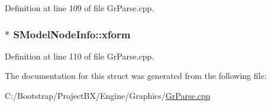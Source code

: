 Definition at line 109 of file GrParse.cpp.\hypertarget{struct_s_model_node_info_3d23e4e63314a9d0115a4fd1c84a14a1}{
\subsubsection[{xform}]{$\ast$ {\bf SModelNodeInfo::xform}}}
\label{struct_s_model_node_info_3d23e4e63314a9d0115a4fd1c84a14a1}




Definition at line 110 of file GrParse.cpp.

The documentation for this struct was generated from the following file:\begin{CompactItemize}
\item 
C:/Bootstrap/ProjectBX/Engine/Graphics/\hyperlink{_gr_parse_8cpp}{GrParse.cpp}\end{CompactItemize}
